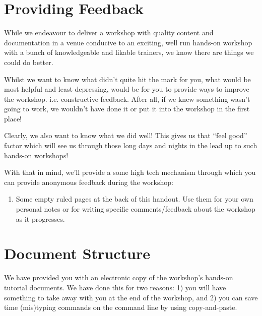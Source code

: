 %
%
\newpage

\section{Providing Feedback}
While we endeavour to deliver a workshop with quality content and documentation in a venue
conducive to an exciting, well run hands-on workshop with a bunch of knowledgeable and likable
trainers, we know there are things we could do better.

Whilst we want to know what didn't quite hit the mark for you, what would be most helpful and least
depressing, would be for you to provide ways to improve the workshop. i.e. constructive feedback.
After all, if we knew something wasn't going to work, we wouldn't have done it or put it into the
workshop in the first place!

Clearly, we also want to know what we did well! This gives us that ``feel good'' factor which will
see us through those long days and nights in the lead up to such hands-on workshops!

With that in mind, we'll provide a some high tech mechanism through which you
can provide anonymous feedback during the workshop:
\begin{enumerate}
  
  \item Some empty ruled pages at the back of this handout. Use them for your own personal notes or
  for writing specific comments/feedback about the workshop as it progresses.
  
\end{enumerate}

\section{Document Structure}
We have provided you with an electronic copy of the workshop's hands-on tutorial documents.
We have done this for two reasons: 1) you will have something to take away with you at the 
end of the workshop, and 2) you can save time (mis)typing commands on the command line by using
copy-and-paste.

